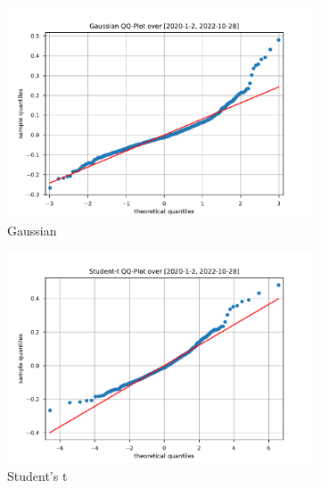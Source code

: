 \begin{figure}[htbp]
    \centering
    \begin{subfigure}[b]{0.32\textwidth}
        \centering
        \includegraphics[width=\textwidth]{content/reschap4/Figures/gauss_QQ_2020-1-2-2022-10-28.pdf}
        \caption{Gaussian}
    \end{subfigure}
    \hfill
    \begin{subfigure}[b]{0.32\textwidth}
        \centering
        \includegraphics[width=\textwidth]{content/reschap4/Figures/student_QQ_2020-1-2-2022-10-28.pdf}
        \caption{Student's t}
    \end{subfigure}
    \hfill
    \begin{subfigure}[b]{0.32\textwidth}
        \centering

\end{subfigure}
\end{figure}
